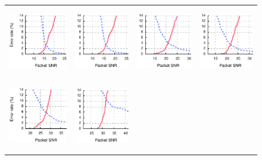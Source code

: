 \begin{figure}[p]
\begin{leftfullpage}
\begin{tabular}{cccc}
	\midrule
	\includegraphics[height=1.2in]{figures/delivery/goodbad/packet_snr_goodbad_16.pdf} &
	\includegraphics[height=1.2in]{figures/delivery/goodbad/packet_snr_goodbad_17.pdf} &
	\includegraphics[height=1.2in]{figures/delivery/goodbad/packet_snr_goodbad_18.pdf} &
	\includegraphics[height=1.2in]{figures/delivery/goodbad/packet_snr_goodbad_19.pdf} \\
	\includegraphics[height=1.2in]{figures/delivery/goodbad/packet_snr_goodbad_20.pdf} &
	\includegraphics[height=1.2in]{figures/delivery/goodbad/packet_snr_goodbad_21.pdf} &

\end{tabular}
\end{leftfullpage}
\end{figure}
